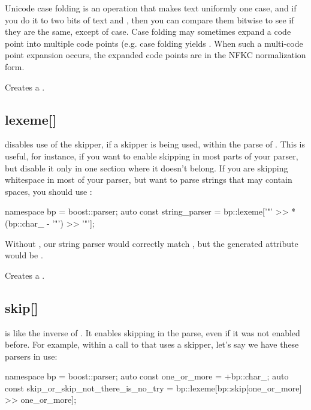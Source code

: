 \documentclass{MyBook}
\begin{document}
\begin{marker}[title=Note ]
Unicode case folding is an operation that makes text uniformly one case, and if you do it to two bits of text  and , then you can compare them bitwise to see if they are the same, except of case. Case folding may sometimes expand a code point into multiple code points (e.g. case folding  yields . When such a multi-code point expansion occurs, the expanded code points are in the NFKC normalization form. 
\end{marker}

Creates a .

\subsection{lexeme{[}{]}}

 disables use of the skipper, if a skipper is being used, within the parse of . This is useful, for instance, if you want to enable skipping in most parts of your parser, but disable it only in one section where it doesn't belong. If you are skipping whitespace in most of your parser, but want to parse strings that may contain spaces, you should use :

\begin{code}
namespace bp = boost::parser;
auto const string_parser = bp::lexeme['"' >> *(bp::char_ - '"') >> '"'];
\end{code}

Without , our string parser would correctly match , but the generated attribute would be .

Creates a .

\subsection{skip{[}{]}}

 is like the inverse of . It enables skipping in the parse, even if it was not enabled before. For example, within a call to  that uses a skipper, let's say we have these parsers in use:

\begin{code}
namespace bp = boost::parser;
auto const one_or_more = +bp::char_;
auto const skip_or_skip_not_there_is_no_try = bp::lexeme[bp::skip[one_or_more] >> one_or_more];
\end{code}
\end{document}
